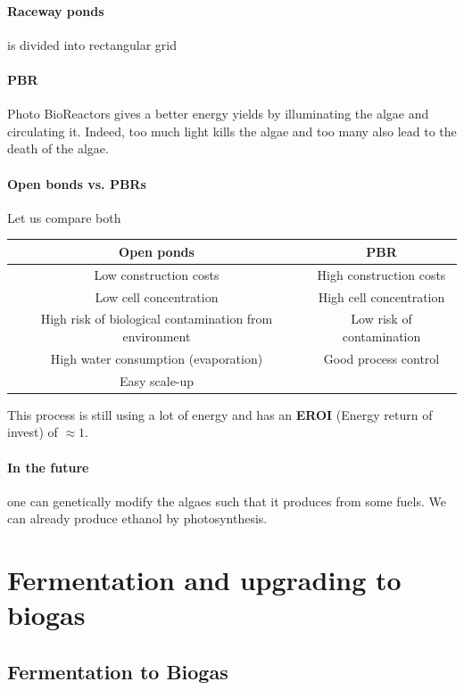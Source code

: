 \documentclass[10pt,a4paper]{article}
\begin{document}
 \paragraph{Raceway ponds}is divided into rectangular grid
 \paragraph{PBR}Photo BioReactors gives a better energy yields by illuminating the algae and circulating it. Indeed, too much light kills the algae and too many also lead to the death of the algae.
 
 \paragraph{Open bonds vs. PBRs} Let us compare both
 \begin{table}[h!]
 \centering
 \begin{tabular}{c|c}
 \textbf{Open ponds} & \textbf{PBR} \\ \hline
 {\color{green}Low} construction costs & {\color{red}High} construction costs \\
 {\color{red}Low} cell concentration & {\color{green}High} cell concentration \\
  {\color{red}High} risk of biological contamination from environment & {\color{green}Low} risk of contamination\\
   {\color{red}High} water consumption (evaporation) & {\color{green}Good} process control \\
  {\color{green}Easy} scale-up & \\
 \end{tabular}
 \end{table}

This process is still using a lot of energy and has an \textbf{EROI} (Energy return of invest) of $\approx 1$.

\paragraph{In the future}one can genetically modify the algaes such that it produces from  some fuels. We can already produce ethanol by photosynthesis. 
 
\section{Fermentation and upgrading to biogas}
 \subsection{Fermentation to Biogas}
\end{document}
